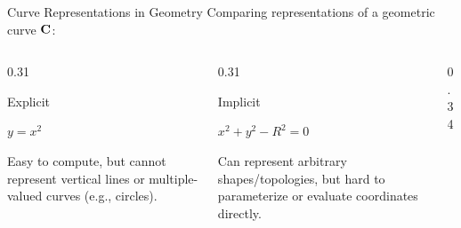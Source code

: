 \begin{frame}{Curve Representations in Geometry}
  Comparing representations of a geometric curve $\mathbf{C}$:
  \begin{columns}[T]
    \begin{column}{0.31\textwidth}
      \begin{block}{Explicit}
        \centering
        \par\vspace{0.1cm}
        \centering\small \textcolor{red!70!black}{$y = x^2$}
        \par\vspace{0.15cm}
        \raggedright\scriptsize
        Easy to compute, but cannot represent vertical lines or multiple-valued curves (e.g., circles).
      \end{block}
    \end{column}
    \begin{column}{0.31\textwidth}
      \begin{block}{Implicit}
        \centering
        \par\vspace{0.1cm}
        \centering\small \textcolor{blue!70!black}{$x^2 + y^2 - R^2 = 0$}
        \par\vspace{0.15cm}
        \raggedright\scriptsize
        Can represent arbitrary shapes/topologies, but hard to parameterize or evaluate coordinates directly.
      \end{block}
    \end{column}
    \begin{column}{0.34\textwidth}

\end{column}
\end{columns}
\end{frame}
